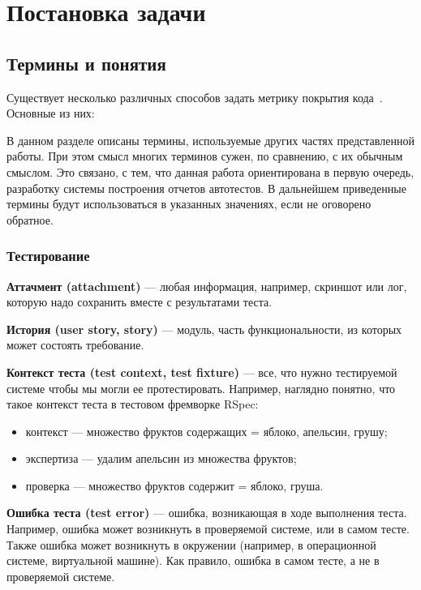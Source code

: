\chapter{Постановка задачи}
\label{chapter1}

\section{Термины и понятия}

Существует несколько различных способов задать метрику покрытия кода~\cite{ipl_cite,too_old_metrics}. Основные из них:

В данном разделе описаны термины, используемые других частях представленной работы. При этом смысл многих терминов сужен, по сравнению, с их обычным смыслом. Это связано, с тем, что данная работа ориентирована в первую очередь, разработку системы построения отчетов автотестов. В дальнейшем приведенные термины будут использоваться в указанных значениях, если не оговорено обратное.

\subsection{Тестирование}

{\bf Аттачмент (attachment)} ---
любая информация, например, скриншот или лог, которую надо сохранить вместе с результатами теста.  

{\bf История (user story, story)} ---
модуль, часть функциональности, из которых может состоять требование.

{\bf Контекст теста (test context, test fixture)} ---
все, что нужно тестируемой системе чтобы мы могли ее протестировать. Например, наглядно понятно, что такое контекст теста в тестовом фремворке RSpec:

\begin{itemize}
\item контекст --- множество фруктов содержащих = {яблоко, апельсин, грушу};
\item экспертиза --- удалим апельсин из множества фруктов;
\item проверка --- множество фруктов содержит = {яблоко, груша}.
\end{itemize}

{\bf Ошибка теста (test error)} ---
ошибка, возникающая в ходе выполнения теста. Например, ошибка может возникнуть в проверяемой системе, или в самом тесте. Также ошибка может возникнуть в окружении (например, в операционной системе, виртуальной машине). Как правило, ошибка в самом тесте, а не в проверяемой системе.

